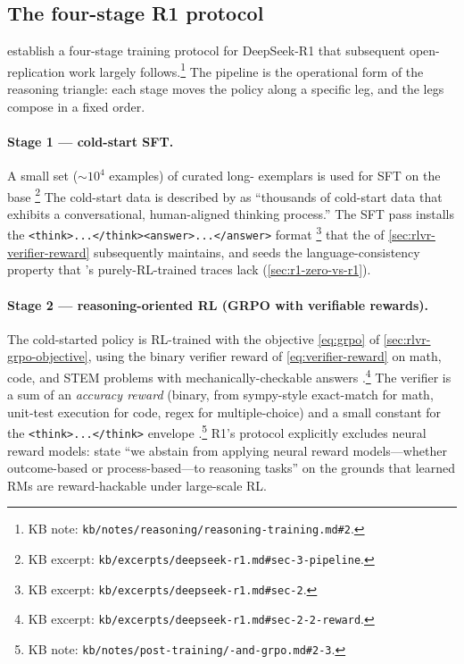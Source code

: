 \subsection{The four-stage R1 protocol}
\label{sec:r1-fourstage}

\citet[\S 2.3]{deepseek-r1} establish a four-stage training protocol
for DeepSeek-R1 that subsequent open-replication work largely
follows.\footnote{KB note:
\texttt{kb/notes/reasoning/reasoning-training.md\#2}.} The pipeline is
the operational form of the reasoning triangle: each stage moves the
policy along a specific leg, and the legs compose in a fixed order.

\paragraph{Stage 1 --- cold-start SFT.} A small set
($\sim\!10^4$ examples) of curated long- exemplars is used for SFT
on the  base \citep[\S
3]{deepseek-r1}\footnote{KB excerpt:
\texttt{kb/excerpts/deepseek-r1.md\#sec-3-pipeline}.} The cold-start
data is described by \citet[\S 3]{deepseek-r1} as
``thousands of cold-start data that exhibits a conversational,
human-aligned thinking process.'' The SFT pass installs the
\texttt{<think>...</think><answer>...</answer>} format
\citep[\S 2]{deepseek-r1}\footnote{KB excerpt:
\texttt{kb/excerpts/deepseek-r1.md\#sec-2}.} that the  of
\cref{sec:rlvr-verifier-reward} subsequently maintains, and seeds the
language-consistency property that 's purely-RL-trained traces
lack (\cref{sec:r1-zero-vs-r1}).

\paragraph{Stage 2 --- reasoning-oriented RL (GRPO with verifiable
rewards).} The cold-started policy is RL-trained with the 
objective \cref{eq:grpo} of \cref{sec:rlvr-grpo-objective}, using the
binary verifier reward of \cref{eq:verifier-reward} on math, code,
and STEM problems with mechanically-checkable answers
\citep[\S 2.2]{deepseek-r1}.\footnote{KB excerpt:
\texttt{kb/excerpts/deepseek-r1.md\#sec-2-2-reward}.} The verifier is
a sum of an \emph{accuracy reward} (binary, from sympy-style
exact-match for math, unit-test execution for code, regex for
multiple-choice) and a small constant \emph{} for the
\texttt{<think>...</think>} envelope
\citep[\S 2.2]{deepseek-r1}.\footnote{KB note:
\texttt{kb/notes/post-training/-and-grpo.md\#2-3}.} R1's protocol
explicitly excludes neural reward models: \citet[\S
2.2]{deepseek-r1} state ``we abstain from applying neural reward
models---whether outcome-based or process-based---to reasoning tasks''
on the grounds that learned RMs are reward-hackable under large-scale
RL.

